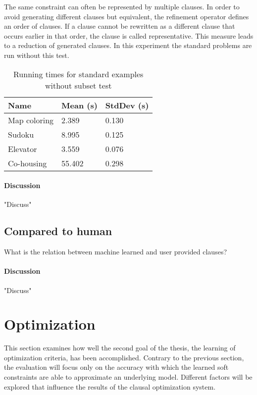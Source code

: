 \begin{experiment}
	The same constraint can often be represented by multiple clauses.
	In order to avoid generating different clauses but equivalent, the refinement operator defines an order of clauses.
	If a clause cannot be rewritten as a different clause that occurs earlier in that order, the clause is called representative.
	This measure leads to a reduction of generated clauses.
	In this experiment the standard problems are run without this test.

	\begin{table}[!htp]
		\begin{tabularx}{\textwidth}{XXX}
			\textbf{Name}	& \textbf{Mean (s)}	& \textbf{StdDev (s)} \\
			\toprule
			Map coloring 	& 2.389				& 0.130 \\
			Sudoku 			& 8.995				& 0.125 \\
			Elevator 		& 3.559 			& 0.076 \\
			Co-housing 		& 55.402			& 0.298
		\end{tabularx}
		\label{tbl:exp_speed_standard}
		\caption{Running times for standard examples without subset test}
	\end{table}

\end{experiment}

\paragraph{Discussion}
"Discuss"

\subsection{Compared to human}

\begin{question}
	What is the relation between machine learned and user provided clauses?
\end{question}


\paragraph{Discussion}
"Discuss"

\section{Optimization}
This section examines how well the second goal of the thesis, the learning of optimization criteria, has been accomplished.
Contrary to the previous section, the evaluation will focus only on the accuracy with which the learned soft constraints are able to approximate an underlying model.
Different factors will be explored that influence the results of the clausal optimization system.

